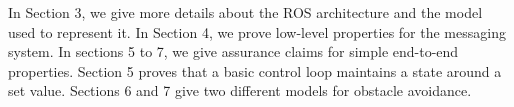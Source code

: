 In Section 3, we give more details about the ROS architecture and the model used to represent it. In Section 4, we prove low-level properties for the messaging system. In sections 5 to 7, we give assurance claims for simple end-to-end properties. Section 5 proves that a basic control loop maintains a state around a set value. Sections 6 and 7 give two different models for obstacle avoidance.